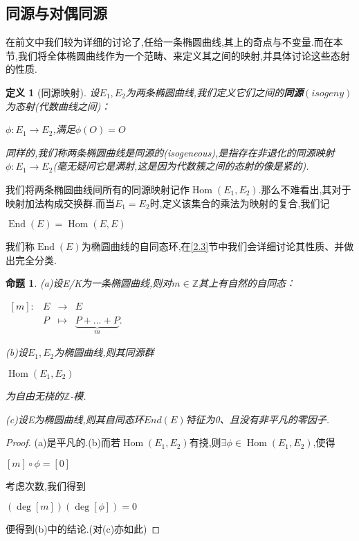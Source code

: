 \documentclass[11pt]{ctexart}
\DeclareMathOperator{\Hom}{Hom}
\DeclareMathOperator{\Deg}{deg}
\DeclareMathOperator{\End}{End}
\newtheorem{defi}{定义}[section]
\newtheorem{pro}{命题}[section]
\begin{document}
\subsection{同源与对偶同源\label{2.2}}

在前文中我们较为详细的讨论了,任给一条椭圆曲线,其上的奇点与不变量.而在本节,我们将全体椭圆曲线作为一个范畴、来定义其之间的映射,并具体讨论这些态射的性质.

\begin{defi}[同源映射]
设$E_1$$,E_2$为两条椭圆曲线,我们定义它们之间的\textbf{同源}$\label{isog}(isogeny)$为态射(代数曲线之间)：

    \begin{center}
        $\phi : E_1 \rightarrow E_2$,满足$\phi(O)=O$
    \end{center}

    \noindent 同样的,我们称两条椭圆曲线是同源的(isogeneous),是指存在非退化的同源映射$\phi : E_1 \rightarrow E_2$(毫无疑问它是满射,这是因为代数簇之间的态射的像是紧的\cite{GTM52}).
\end{defi}  
\noindent 我们将两条椭圆曲线间所有的同源映射记作$\Hom(E_1,E_2)$.那么不难看出,其对于映射加法构成交换群.而当$E_1=E_2$时,定义该集合的乘法为映射的复合,我们记
\begin{center}
    $\End(E)=\Hom(E,E)$
\end{center}
\noindent 我们称$\End(E)$为椭圆曲线的自同态环,在\ref{2.3}节中我们会详细讨论其性质、并做出完全分类.

\begin{pro}(a)设E/K为一条椭圆曲线,则对$m\in \mathbb{Z}$其上有自然的自同态：
    \begin{center}
       $ \begin{array}{llcc}
            [m]:&E&\longrightarrow &E\\
        
                &P &\longmapsto &\underbrace{P+...+P}_{m} .
        \end{array}$
    \end{center}
    (b)设$E_1,E_2$为椭圆曲线,则其同源群
    \begin{center}
        $\Hom(E_1,E_2)$
    \end{center}
    \noindent 为自由无挠的$\mathbb{Z}$-模.

    \noindent (c)设E为椭圆曲线,则其自同态环$End(E)$特征为0、且没有非平凡的零因子.



\end{pro}

\begin{proof} (a)是平凡的.(b)而若$\Hom(E_1,E_2)$有挠,则$\exists \phi \in \Hom(E_1,E_2)$,使得
\begin{center}
   $ [m]\circ \phi = [0]$
\end{center}
\noindent 考虑次数,我们得到
\begin{center}
    $(\Deg[m])(\Deg[\phi])=0$
\end{center}
\noindent 便得到(b)中的结论.(对(c)亦如此)
\end{proof}
\end{document}
